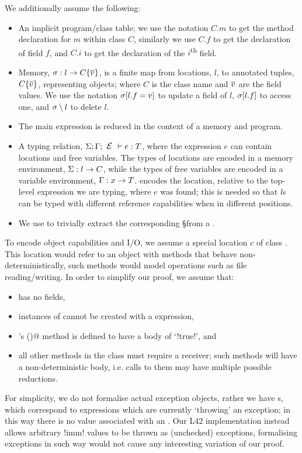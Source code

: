 We additionally assume the following:
\begin{itemize}
	\item An implicit program/class table; we use the notation $C.m$ to get the method declaration for $m$ within class $C$, similarly we use $C.f$ to get the declaration of field $f$, and $C.i$ to get the declaration of the $i$\textsuperscript{th} field.
	\item Memory, $\s : l\rightarrow C\{\Many{v}\}${, is} a finite map from locations, $l$, to annotated tuples, $C\{\Many{v}\}$, representing objects; where $C$ is the class name and $\Many{v}$ are the field values.
	We use the notation $\s[l.f=v]$ to update a field of $l$, $\s[l.f]$ to access one, and $\s \setminus l$ to delete $l$.
	\item The main expression is reduced in the context of a memory and program.
	\item A typing relation, $\S;\G;\E\vdash e:T$, where 
	the expression $e$ can contain locations and free variables. The types of locations are encoded in 
a memory environment, 
$\S : l\rightarrow C$,
	while the types of free variables are encoded in
a variable environment, $\G : x\rightarrow T$. \E encodes the location, relative to the top-level expression we are typing, where $e$ was found; this is needed so that $l$s can be typed with different reference capabilities when in different positions.
	\item We use \Ss to trivially extract the corresponding \S from a \s.
\end{itemize}

\noindent To encode object capabilities and I/O, we assume a special location  $c$ of class \Q@Cap@. This location would refer to an object with methods that behave non-deterministically, such methods would model operations such as file reading/writing. In order to simplify our proof, we assume that:
\begin{itemize}
	\item \Q@Cap@ has no fields,
	\item instances of \Q@Cap@ cannot be created with a \Q@new@ expression,
	\item \Q@Cap@'s \Q@invariant()@ method is defined to have a body of `\Q!true!', and
	\item all other methods in the \Q@Cap@ class must require a \Q@mut@ receiver; such methods will have a non-deterministic body, i.e. calls to them may have multiple possible reductions.
\end{itemize}
For simplicity, we do not formalise actual exception objects, rather we have \error{}s, which correspond to expressions which are currently  `throwing' an exception; 
in this way there is no value associated with an \error.
Our L42 implementation instead allows arbitrary \Q!imm! values to be thrown as (unchecked) exceptions, formalising exceptions in such way would not cause any interesting variation of our proof.

